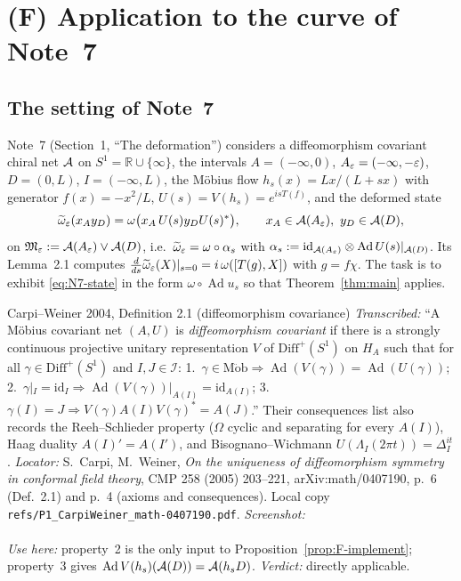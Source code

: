 \documentclass[11pt]{article}
\newcommand{\Om}{\Omega}
\newcommand{\Ad}{\operatorname{Ad}}\newcommand{\ket}[1]{|#1\rangle}\newcommand{\bra}[1]{\langle#1|}
\begin{document}
\section{(F) Application to the curve of Note~7}\label{sec:note7}

\subsection{The setting of Note~7}
Note~7 (Section~1, ``The deformation'') considers a diffeomorphism covariant chiral net $\mathcal A$ on $S^1=\mathbb R\cup\{\infty\}$,
the intervals $A=(-\infty,0)$, $A_\varepsilon=(-\infty,-\varepsilon)$, $D=(0,L)$, $I=(-\infty,L)$, the M\"obius flow
$h_s(x)=Lx/(L+sx)$ with generator $f(x)=-x^2/L$, $U(s)=V(h_s)=e^{isT(f)}$, and the deformed state
\begin{equation}\label{eq:N7-state}
 \widetilde\omega_\varepsilon(x_Ay_D)=\omega\bigl(x_A\,U(s)y_DU(s)^*\bigr),\qquad x_A\in\mathcal A(A_\varepsilon),\ y_D\in\mathcal A(D),
\end{equation}
on $\mathfrak M_\varepsilon:=\mathcal A(A_\varepsilon)\vee\mathcal A(D)$, i.e.\ $\widetilde\omega_\varepsilon=\omega\circ\alpha_s$ with
$\alpha_s:=\mathrm{id}_{\cA(A_\eps)}\otimes\Ad U(s)|_{\cA(D)}$.  Its Lemma~2.1 computes
$\frac{d}{ds}\widetilde\omega_\varepsilon(X)|_{s=0}=i\,\omega([T(g),X])$ with $g=f\chi$.
The task is to exhibit \eqref{eq:N7-state} in the form $\omega\circ\Ad u_s$ so that Theorem~\ref{thm:main} applies.

\begin{citedbox}{Carpi--Weiner 2004, Definition 2.1 (diffeomorphism covariance)}
\emph{Transcribed:} ``A M\"obius covariant net $(A,U)$ is \emph{diffeomorphism covariant} if there is a strongly
continuous projective unitary representation $V$ of $\mathrm{Diff}^+(S^1)$ on $H_A$ such that for all
$\gamma\in\mathrm{Diff}^+(S^1)$ and $I,J\in\mathcal I$: 1.\ $\gamma\in\mathrm{M\ddot ob}\Rightarrow
\Ad(V(\gamma))=\Ad(U(\gamma))$; 2.\ $\gamma|_I=\mathrm{id}_I\Rightarrow\Ad(V(\gamma))|_{A(I)}=\mathrm{id}_{A(I)}$;
3.\ $\gamma(I)=J\Rightarrow V(\gamma)A(I)V(\gamma)^*=A(J)$.''  Their consequences list also records the
Reeh--Schlieder property ($\Om$ cyclic and separating for every $A(I)$), Haag duality $A(I)'=A(I')$, and
Bisognano--Wichmann $U(\Lambda_I(2\pi t))=\Delta_I^{it}$.
\emph{Locator:} S.~Carpi, M.~Weiner, \emph{On the uniqueness of diffeomorphism symmetry in conformal field theory},
CMP 258 (2005) 203--221, arXiv:math/0407190, p.~6 (Def.~2.1) and p.~4 (axioms and consequences).
Local copy \texttt{refs/P1\_CarpiWeiner\_math-0407190.pdf}.
\emph{Screenshot:}\\
\\
\emph{Use here:} property~2 is the only input to Proposition~\ref{prop:F-implement}; property~3 gives
$\Ad V(h_s)(\cA(D))=\cA(h_sD)$.  \emph{Verdict:} directly applicable.
\end{citedbox}
\end{document}
